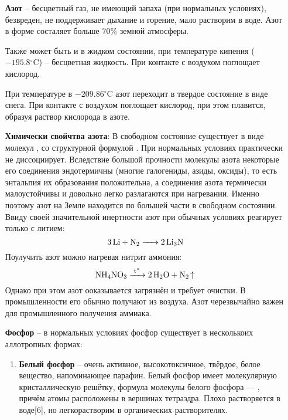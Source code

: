 \begin{itemize}
    \item[\textbf{Азот}] -- бесцветный газ, не имеющий запаха  (при нормальных условиях), безвреден, не поддерживает дыхание и горение, мало растворим в воде. Азот в форме  состаляет больше 70\% земной атмосферы.

    Также может быть и в жидком состоянии, при температуре кипения ($-195.8 {}^{\circ}\mathrm{C}$) -- бесцветная жидкость. При контакте с воздухом поглощает кислород.

    При температуре в $-209.86 {}^{\circ}\mathrm{C}$ азот переходит в твердое состояние в виде снега. При контакте с воздухом поглощает кислород, при этом плавится, образуя раствор кислорода в азоте.
    
    \textbf{Химически свойчтва азота}:
    В свободном состояние существует в виде молекул , со структурной формулой . При нормальных условиях практически не диссоциирует. Вследствие большой прочности молекулы азота некоторые его соединения эндотермичны (многие галогениды, азиды, оксиды), то есть энтальпия их образования положительна, а соединения азота термически малоустойчивы и довольно легко разлагаются при нагревании. Именно поэтому азот на Земле находится по большей части в свободном состоянии. Ввиду своей значительной инертности азот при обычных условиях реагирует только с литием:
    \begin{equation*}
        \ce{3Li + N2 -> 2Li3N}  
    \end{equation*}
    Поулучить азот можно нагревая нитрит аммония:
    \begin{equation*}
        \ce{NH4NO3 ->[t^{\circ}] 2H2O + N2 ^} 
    \end{equation*}
    Однако при этом азот ооказывается загрязнён и требует очистки. В промышленности его обычно получают из воздуха. Азот черезвычайно важен для промышленного получения аммиака.
    \item[\textbf{Фосфор}] -- в нормальных условиях фосфор существует в несколькоих аллотропных формах:
    \begin{enumerate}
        \item \textbf{Белый фосфор} -- очень активное, высокотоксичное, твёрдое, белое вещество, напоминающее парафин. Белый фосфор имеет молекулярную кристаллическую решётку, формула молекулы белого фосфора — , причём атомы расположены в вершинах тетраэдра. Плохо растворяется в воде[6], но легкорастворим в органических растворителях.
        

\end{enumerate}
\end{itemize}
